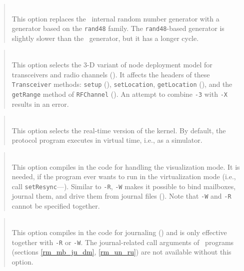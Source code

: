 \begin{quote}
\noindent{}\\ \hspace{0in}
This option replaces the \smurph\ internal random number generator with
a generator based on the {\tt rand48} family.
The {\tt rand48}-based generator is slightly slower than the \smurph\ generator,
but it has a longer cycle.
\end{quote}

\begin{quote}
\noindent{}\\ \hspace{0in}
This option selects the 3-D variant of node deployment model for transceivers
and radio channels ().
It affects the headers of these {\tt Transceiver} methods:
{\tt setup} (), {\tt setLocation}, {\tt getLocation}
(), and the {\tt getRange} method of {\tt RFChannel}
().
An attempt to combine {\tt -3} with {\tt -X} results in an error.
\end{quote}

\begin{quote}
\noindent{}\\ \hspace{0in}
This option selects the real-time version of the kernel.
By default, the protocol program executes in virtual time, i.e., as a
simulator.
\end{quote}

\begin{quote}
\noindent{}\\ \hspace{0in}
This option compiles in the code for handling the visualization mode.
It is needed, if the program ever wants to run in the virtualization mode
(i.e., call {\tt setResync}---).
Similar to {\tt -R}, {\tt -W} makes it possible to bind mailboxes, journal
them, and drive them from journal files ().
Note that {\tt -W} and {\tt -R} cannot be specified together.
\end{quote}

\begin{quote}
\noindent{}\\ \hspace{0in}
This option compiles in the code for journaling () and is
only effective together with {\tt -R} or {\tt -W}.
The journal-related call arguments of \smurph\ programs (sections
\ref{rm_mb_ju_dm}, \ref{rm_un_ru}) are not available without this option.
\end{quote}

